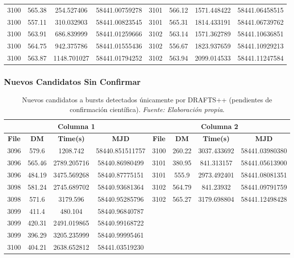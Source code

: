 \begin{table}[H]
\begin{tabular}{|c|c|c|c|c|c|c|c|}
        3100 & 565.38 & 254.527406 & 58441.00759278 & 3101 & 566.12 & 1571.448422 & 58441.06458515 \\
        3100 & 557.11 & 310.032903 & 58441.00823545 & 3101 & 565.31 & 1814.433191 & 58441.06739762 \\
        3100 & 563.91 & 686.839999 & 58441.01259666 & 3102 & 563.14 & 1571.362789 & 58441.10636851 \\
        3100 & 564.75 & 942.375786 & 58441.01555436 & 3102 & 556.67 & 1823.937659 & 58441.10929213 \\
        3100 & 563.87 & 1148.701027 & 58441.01794252 & 3102 & 563.94 & 2099.014533 & 58441.11247584 \\
        \hline
    \end{tabular}
\end{table}

\subsubsection{Nuevos Candidatos Sin Confirmar}

\begin{table}[H]
    \centering
    \caption{Nuevos candidatos a bursts detectados únicamente por DRAFTS++ (pendientes de confirmación científica). \textit{Fuente: Elaboración propia}.}
    \label{tab:anexo_candidate_bursts}
    \begin{tabular}{|c|c|c|c|c|c|c|c|}
        \hline
        \multicolumn{4}{|c|}{\textbf{Columna 1}} & \multicolumn{4}{|c|}{\textbf{Columna 2}} \\
        \hline
        \textbf{File} & \textbf{DM} & \textbf{Time(s)} & \textbf{MJD} & \textbf{File} & \textbf{DM} & \textbf{Time(s)} & \textbf{MJD} \\
        \hline
        3096 & 579.6 & 1208.742 & 58440.851511757 & 3100 & 260.22 & 3037.433692 & 58441.03980380 \\
        3096 & 565.46 & 2789.205716 & 58440.86980499 & 3101 & 380.95 & 841.313157 & 58441.05613900 \\
        3096 & 484.19 & 3475.569268 & 58440.87775151 & 3101 & 555.9 & 2973.492401 & 58441.08081351 \\
        3098 & 581.24 & 2745.689702 & 58440.93681364 & 3102 & 564.79 & 841.23932 & 58441.09791759 \\
        3098 & 571.6 & 3179.596 & 58440.95285796 & 3102 & 565.27 & 3179.698804 & 58441.12498428 \\
        3099 & 411.4 & 480.104 & 58440.96840787 & & & & \\
        3099 & 420.31 & 2491.019865 & 58440.99168722 & & & & \\
        3099 & 396.29 & 3205.235999 & 58440.99995461 & & & & \\
        3100 & 404.21 & 2638.652812 & 58441.03519230 & & & & \\
        \hline
    \end{tabular}
\end{table}

